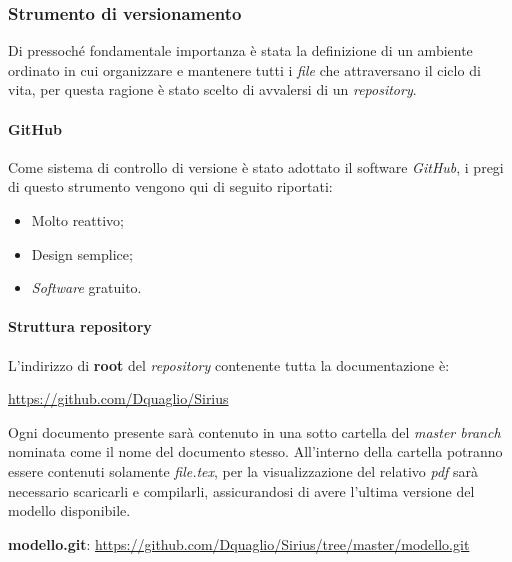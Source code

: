 \subsubsection{Strumento di versionamento}
Di pressoché fondamentale importanza è stata la definizione di un ambiente ordinato in cui organizzare e mantenere tutti i \textit{file} che attraversano il ciclo di vita, per questa ragione è stato scelto di avvalersi di un \textit{repository}. 

\paragraph{GitHub}
Come sistema di controllo di versione è stato adottato il software \textit{GitHub}, i pregi di questo strumento vengono qui di seguito riportati:
\begin{itemize}
\item Molto reattivo;
\item Design semplice; 
\item \textit{Software} gratuito.
\end{itemize}

\paragraph{Struttura repository}
L'indirizzo di \textbf{root} del \textit{repository} contenente tutta la documentazione è:
\begin{center}
\href{https://github.com/Dquaglio/Sirius}{https://github.com/Dquaglio/Sirius}
\end{center}

Ogni documento presente sarà contenuto in una sotto cartella del \textit{master branch} nominata come il nome del documento stesso.
All'interno della cartella potranno essere contenuti solamente \textit{file.tex}, per la visualizzazione del relativo \textit{pdf} sarà necessario scaricarli e compilarli, assicurandosi di avere l'ultima versione del modello disponibile.
\begin{center}
\textbf{modello.git}: \href{https://github.com/Dquaglio/Sirius/tree/master/modello.git}{https://github.com/Dquaglio/Sirius/tree/master/modello.git}
\end{center}

